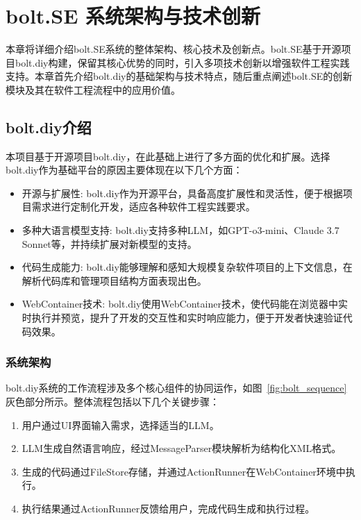 \chapter{bolt.SE 系统架构与技术创新}
\label{chap:code-generation}

本章将详细介绍bolt.SE系统的整体架构、核心技术及创新点。bolt.SE基于开源项目bolt.diy构建，保留其核心优势的同时，引入多项技术创新以增强软件工程实践支持。本章首先介绍bolt.diy的基础架构与技术特点，随后重点阐述bolt.SE的创新模块及其在软件工程流程中的应用价值。

\section{bolt.diy介绍}

本项目基于开源项目bolt.diy，在此基础上进行了多方面的优化和扩展。选择bolt.diy作为基础平台的原因主要体现在以下几个方面：

\begin{itemize}
    \item 开源与扩展性: bolt.diy作为开源平台，具备高度扩展性和灵活性，便于根据项目需求进行定制化开发，适应各种软件工程实践要求。
    \item 多种大语言模型支持: bolt.diy支持多种LLM，如GPT-o3-mini、Claude 3.7 Sonnet等，并持续扩展对新模型的支持。
    \item 代码生成能力: bolt.diy能够理解和感知大规模复杂软件项目的上下文信息，在解析代码库和管理项目结构方面表现出色。
    \item WebContainer技术: bolt.diy使用WebContainer技术，使代码能在浏览器中实时执行并预览，提升了开发的交互性和实时响应能力，便于开发者快速验证代码效果。
\end{itemize}

\subsection{系统架构}

bolt.diy系统的工作流程涉及多个核心组件的协同运作，如图~\ref{fig:bolt_sequence}灰色部分所示。整体流程包括以下几个关键步骤：
\begin{enumerate}
    \item 用户通过UI界面输入需求，选择适当的LLM。
    \item LLM生成自然语言响应，经过MessageParser模块解析为结构化XML格式。
    \item 生成的代码通过FileStore存储，并通过ActionRunner在WebContainer环境中执行。
    \item 执行结果通过ActionRunner反馈给用户，完成代码生成和执行过程。
\end{enumerate}

